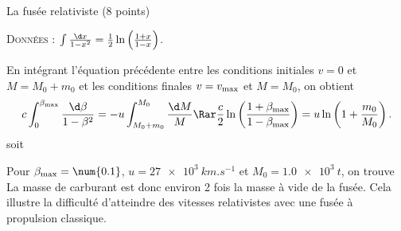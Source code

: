 \begin{exo}[PC][1][devoir]{La fusée relativiste (8 points)}
\begin{quest}
{    \textsc{Données} : $\int \frac{\d x}{1 - x^2} = \frac{1}{2} \ln \left( \frac{1+x}{1-x} \right)$.}
    {
      En intégrant l'équation précédente entre les conditions initiales $v=0$ et $M=M_0 + m_0$ et les conditions finales $v=v_{\rm max}$ et $M=M_0$, on obtient
      $$
      c \int_0^{\beta_{\rm max}} \frac{\d \beta}{1 - \beta^2} = - u \int_{M_0 + m_0}^{M_0} \frac{\d M}{M} \Rar \frac{c}{2} \ln \left( \frac{1 + \beta_{\rm max}}{1 - \beta_{\rm max}} \right) = u \ln \left( 1+ \frac{m_0}{M_0} \right).
      $$
      soit 

      Pour $\beta_{\rm max} = \num{0.1}$, $u = \SI{27e3}{km.s^{-1}}$ et $M_0 = \SI{1.0e3}{t}$, on trouve
      La masse de carburant est donc environ 2 fois la masse à vide de la fusée. Cela illustre la difficulté d'atteindre des vitesses relativistes avec une fusée à propulsion classique.

      }
  \end{quest}
  \end{exo}
  
